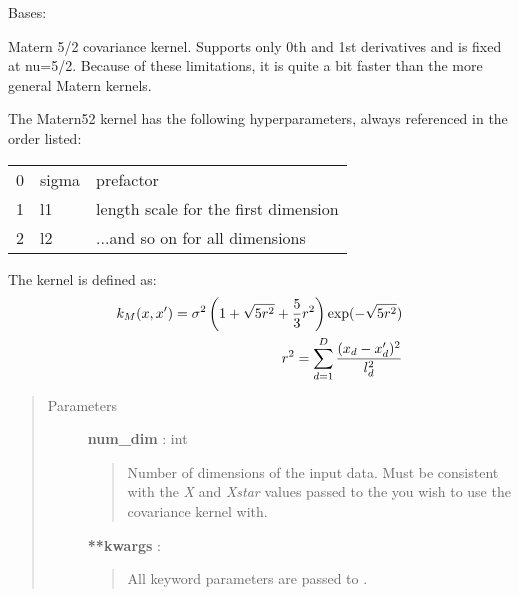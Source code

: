 \documentclass[letterpaper,10pt,english]{sphinxmanual}
\begin{document}
\begin{fulllineitems}
\label{gptools.kernel:gptools.kernel.matern.Matern52Kernel}
Bases: {\hyperref[gptools.kernel:gptools.kernel.core.Kernel]{}}

Matern 5/2 covariance kernel. Supports only 0th and 1st derivatives
and is fixed at nu=5/2. Because of these limitations, it is quite a bit
faster than the more general Matern kernels.

The Matern52 kernel has the following hyperparameters, always referenced in
the order listed:

\begin{tabulary}{\linewidth}{|L|L|L|}
\hline

0
 & 
sigma
 & 
prefactor
\\

1
 & 
l1
 & 
length scale for the first dimension
\\

2
 & 
l2
 & 
...and so on for all dimensions
\\
\hline\end{tabulary}


The kernel is defined as:
\begin{gather}
\begin{split}k_M(x, x') = \sigma^2 \left(1 + \sqrt{5r^2} + \frac{5}{3}r^2\right) \exp(-\sqrt{5r^2}) \\
r^2 = \sum_{d=1}^D \frac{(x_d - x'_d)^2}{l_d^2}\end{split}\notag
\end{gather}\begin{quote}\begin{description}
\item[{Parameters}] \leavevmode
\textbf{num\_dim} : int
\begin{quote}

Number of dimensions of the input data. Must be consistent with the \emph{X}
and \emph{Xstar} values passed to the {\hyperref[gptools:gptools.gaussian_process.GaussianProcess]{}}
you wish to use the covariance kernel with.
\end{quote}

\textbf{**kwargs} :
\begin{quote}

All keyword parameters are passed to {\hyperref[gptools.kernel:gptools.kernel.core.Kernel]{}}.
\end{quote}


\end{description}
\end{quote}
\end{fulllineitems}
\end{document}
